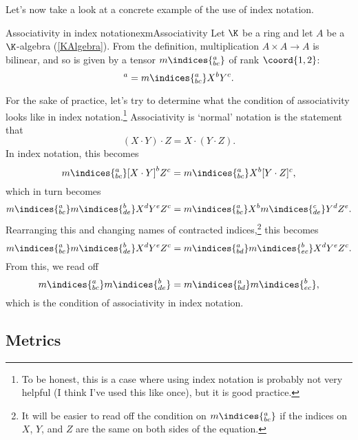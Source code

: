 Let's now take a look at a concrete example of the use of index notation.
\begin{exm}{Associativity in index notation}{exmAssociativity}
	Let $\K$ be a ring and let $A$ be a $\K$-algebra (\cref{KAlgebra}).  From the definition, multiplication $A\times A\rightarrow A$ is bilinear, and so is given by a tensor $m\indices{^a_{bc}}$ of rank $\coord{1,2}$:
	\begin{equation}
		[X\cdot Y]^a=m\indices{^a_{bc}}X^bY^c.
	\end{equation}
	
	For the sake of practice, let's try to determine what the condition of associativity looks like in index notation.\footnote{To be honest, this is a case where using index notation is probably not very helpful (I think I've used this like once), but it is good practice.}  Associativity is `normal' notation is the statement that
	\begin{equation}
		(X\cdot Y)\cdot Z=X\cdot (Y\cdot Z).
	\end{equation}
	In index notation, this becomes
	\begin{equation}
		m\indices{^a_{bc}}[X\cdot Y]^bZ^c=m\indices{^a_{bc}}X^b[Y\cdot Z]^c,
	\end{equation}
	which in turn becomes
	\begin{equation}
		m\indices{^a_{bc}}m\indices{^b_{de}}X^dY^eZ^c=m\indices{^a_{bc}}X^bm\indices{^c_{de}}Y^dZ^e.
	\end{equation}
	Rearranging this and changing names of contracted indices,\footnote{It will be easier to read off the condition on $m\indices{^a_{bc}}$ if the indices on $X$, $Y$, and $Z$ are the same on both sides of the equation.} this becomes
	\begin{equation}
		m\indices{^a_{bc}}m\indices{^b_{de}}X^dY^eZ^c=m\indices{^a_{bd}}m\indices{^b_{ec}}X^dY^eZ^c.
	\end{equation}
	From this, we read off
	\begin{equation}
		m\indices{^a_{bc}}m\indices{^b_{de}}=m\indices{^a_{bd}}m\indices{^b_{ec}},
	\end{equation}
	which is the condition of associativity in index notation.
\end{exm}

\subsection{Metrics}

